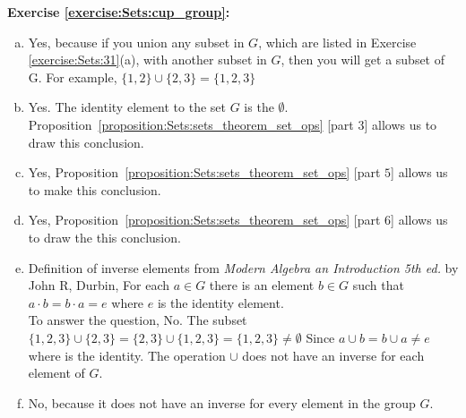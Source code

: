 \noindent\textbf{Exercise \ref{exercise:Sets:cup_group}:} %
\begin{enumerate}[(a)]
\item
Yes, because if you union any subset in $G$, which are listed in Exercise \ref{exercise:Sets:31}(a), with another subset in $G$, then you will get a subset of G. For example, $\{1,2\}\cup \{2,3\}=\{1,2,3\}$

\item
Yes. The identity element to the set $G$ is the $\emptyset$. Proposition~\ref{proposition:Sets:sets_theorem_set_ops} [part $3$] allows us to draw this conclusion.

\item
Yes, Proposition~\ref{proposition:Sets:sets_theorem_set_ops} [part $5$] allows us to make this conclusion.

\item
Yes, Proposition~\ref{proposition:Sets:sets_theorem_set_ops} [part $6$] allows us to draw the this conclusion.

\item
Definition of inverse elements from \textit{Modern Algebra an Introduction 5th ed.} by John R, Durbin, For each $a\in G$ there is an element $b\in G$ such that $a \cdot b = b \cdot a = e$ where $e$ is the identity element.\\
        
To answer the question, No. The subset $\{1,2,3\}\cup \{2,3\}=\{2,3\}\cup \{1,2,3\}=\{1,2,3\}\neq {\emptyset}$ Since $a\cup b = b\cup a\neq e$ where is the identity. The operation $\cup$ does not have an inverse for each element of $G$.

\item
No, because it does not have an inverse for every element in the group $G$.
\end{enumerate}

